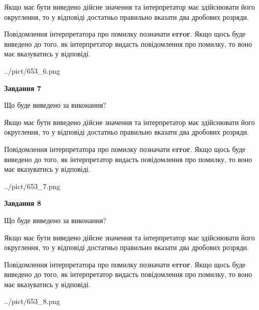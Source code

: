 \documentclass[12pt, ukrainian]{article}
\begin{document}
{\begin {Large}
Якщо має бути виведено дійсне значення та інтерпретатор має здійснювати його округлення, 
то у відповіді достатньо правильно вказати два дробових розряди.

Повідомлення інтерпретатора про помилку позначати \textbf{error}.
Якщо щось буде виведено до того, як інтерпретатор видасть повідомлення про помилку, 
то воно має вказуватись у відповіді. \par

\begin{center}
	{../pict/653_6.png}
\end{center}
\newpage

{\begin {center}\textbf{Завдання 7}\end {center}}\par
Що буде виведено за виконання? \par

Якщо має бути виведено дійсне значення та інтерпретатор має здійснювати його округлення, 
то у відповіді достатньо правильно вказати два дробових розряди.

Повідомлення інтерпретатора про помилку позначати \textbf{error}.
Якщо щось буде виведено до того, як інтерпретатор видасть повідомлення про помилку, 
то воно має вказуватись у відповіді. \par

\begin{center}
	{../pict/653_7.png}
\end{center}
\newpage

{\begin {center}\textbf{Завдання 8}\end {center}}\par
Що буде виведено за виконання? \par

Якщо має бути виведено дійсне значення та інтерпретатор має здійснювати його округлення, 
то у відповіді достатньо правильно вказати два дробових розряди.

Повідомлення інтерпретатора про помилку позначати \textbf{error}.
Якщо щось буде виведено до того, як інтерпретатор видасть повідомлення про помилку, 
то воно має вказуватись у відповіді. \par

\begin{center}
	{../pict/653_8.png}
\end{center}
\newpage


\end{Large}}
\end{document}
